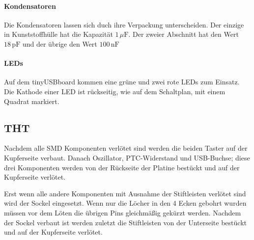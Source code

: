 \paragraph*{Kondensatoren}
Die Kondensatoren lassen sich duch ihre Verpackung unterscheiden. Der einzige in Kunststoffhülle hat die Kapazität $1\,\mu \mathrm{F}$. Der zweier Abschnitt hat den Wert $18\,\mathrm{pF}$ und der übrige den Wert $100\, \mathrm{nF}$
\paragraph*{LEDs}
Auf dem tinyUSBboard kommen eine grüne und zwei rote LEDs zum Einsatz.
\newpage
Die Kathode einer LED ist rückseitig, wie auf dem Schaltplan, mit einem Quadrat markiert.

\subsection{THT}
Nachdem alle SMD Komponenten verlötet sind werden die beiden Taster auf der Kupferseite verbaut.
Danach Oszillator, PTC-Widerstand und USB-Buchse; diese drei Komponenten werden von der Rückseite der Platine bestückt und auf der Kupferseite verlötet.

Erst wenn alle andere Komponenten mit Ausnahme der Stiftleisten verlötet sind wird der Sockel eingesetzt. Wenn nur die Löcher in den 4 Ecken gebohrt wurden müssen vor dem Löten die übrigen Pins gleichmäßig gekürzt werden.
Nachdem der Sockel verbaut ist werden zuletzt die Stiftleisten von der Unterseite bestückt und auf der Kupferseite verlötet.




